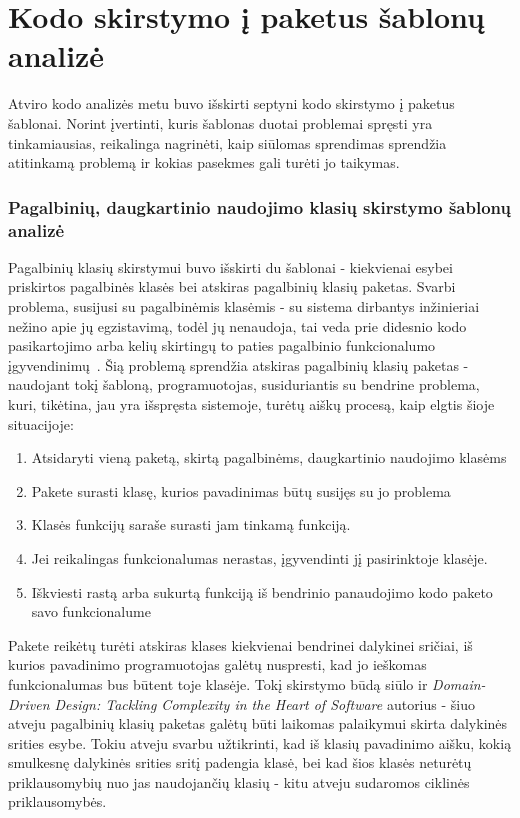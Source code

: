\section{Kodo skirstymo į paketus šablonų analizė}
Atviro kodo analizės metu buvo išskirti septyni kodo skirstymo į paketus šablonai.
Norint įvertinti, kuris šablonas duotai problemai spręsti yra tinkamiausias, reikalinga nagrinėti, kaip siūlomas sprendimas
sprendžia atitinkamą problemą ir kokias pasekmes gali turėti jo taikymas.

\subsubsection{Pagalbinių, daugkartinio naudojimo klasių skirstymo šablonų analizė}
Pagalbinių klasių skirstymui buvo išskirti du šablonai - kiekvienai esybei priskirtos pagalbinės klasės bei atskiras pagalbinių klasių paketas.
Svarbi problema, susijusi su pagalbinėmis klasėmis - su sistema dirbantys inžinieriai nežino apie jų egzistavimą, todėl jų nenaudoja,
tai veda prie didesnio kodo pasikartojimo arba kelių skirtingų to paties pagalbinio funkcionalumo įgyvendinimų~\cite{Utility}.
Šią problemą sprendžia atskiras pagalbinių klasių paketas - naudojant tokį šabloną, programuotojas, susiduriantis su bendrine problema, kuri, tikėtina, jau yra išspręsta sistemoje, turėtų
aiškų procesą, kaip elgtis šioje situacijoje:
\begin{enumerate}
    \item Atsidaryti vieną paketą, skirtą pagalbinėms, daugkartinio naudojimo klasėms
    \item Pakete surasti klasę, kurios pavadinimas būtų susijęs su jo problema
    \item Klasės funkcijų saraše surasti jam tinkamą funkciją.
    \item Jei reikalingas funkcionalumas nerastas, įgyvendinti jį pasirinktoje klasėje.
    \item Iškviesti rastą arba sukurtą funkciją iš bendrinio panaudojimo kodo paketo savo funkcionalume
\end{enumerate}
Pakete reikėtų turėti atskiras klases kiekvienai bendrinei dalykinei sričiai, iš kurios pavadinimo programuotojas galėtų nuspresti,
kad jo ieškomas funkcionalumas bus būtent toje klasėje.
Tokį skirstymo būdą siūlo ir \textit{Domain-Driven Design: Tackling Complexity in the Heart of Software} autorius - šiuo atveju
pagalbinių klasių paketas galėtų būti laikomas palaikymui skirta dalykinės srities esybe.
Tokiu atveju svarbu užtikrinti, kad iš klasių pavadinimo aišku, kokią smulkesnę dalykinės srities sritį padengia klasė, bei kad šios klasės
neturėtų priklausomybių nuo jas naudojančių klasių - kitu atveju sudaromos ciklinės priklausomybės.

